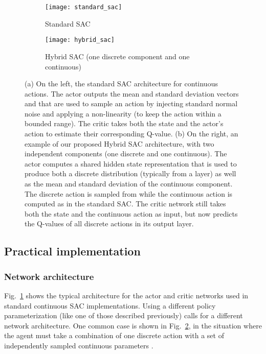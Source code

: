 \documentclass[letterpaper]{article} \usepackage{aaai20}  \usepackage{times}  \usepackage{helvet} \usepackage{courier}  \usepackage[hyphens]{url}  \usepackage{graphicx} \urlstyle{rm} \def\UrlFont{\rm}  \usepackage{graphicx}  \usepackage[section]{placeins}
\begin{document}
\begin{figure*}[htbp]
 
\begin{subfigure}{0.48\textwidth}
\texttt{[image: standard\_sac]}
\caption{Standard SAC}
\label{fig:sac_standard}
\end{subfigure}
\hfill
\begin{subfigure}{0.48\textwidth}
\texttt{[image: hybrid\_sac]}
\caption{Hybrid SAC (one discrete component and one continuous)}
\label{fig:sac_hybrid}
\end{subfigure}
 
\caption{(a) On the left, the standard SAC architecture for continuous actions. The actor outputs the mean and standard deviation vectors  and  that are used to sample an action  by injecting standard normal noise  and applying a  non-linearity (to keep the action within a bounded range).
The critic takes both the state  and the actor's action  to estimate their corresponding Q-value.
(b) On the right, an example of our proposed Hybrid SAC architecture, with two independent components (one discrete and one continuous).
The actor computes a shared hidden state representation  that is used to produce both a discrete distribution  (typically from a  layer) as well as the mean  and standard deviation  of the continuous component.
The discrete action  is sampled from  while the continuous action  is computed as in the standard SAC.
The critic network still takes both the state  and the continuous action  as input, but now predicts the Q-values of all discrete actions in its output layer.
}
\label{fig:sac}
\end{figure*}
 
\subsection{Practical implementation}
 
\subsubsection{Network architecture}
 
Fig.~\ref{fig:sac_standard} shows the typical architecture for the actor and critic networks used in standard continuous SAC implementations.
Using a different policy parameterization (like one of those described previously) calls for a different network architecture.
One common case is shown in Fig.~\ref{fig:sac_hybrid}, in the situation where the agent must take a combination of one discrete action  with a set of independently sampled continuous parameters .
\end{document}
